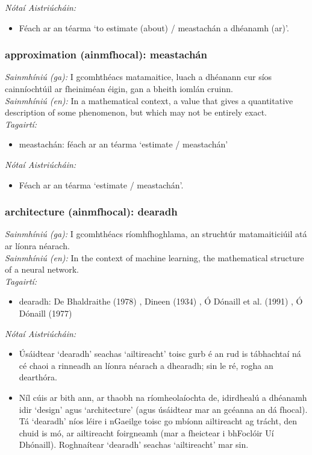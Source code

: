  \noindent \textit{Nótaí Aistriúcháin:}
\begin{itemize}
	\item Féach ar an téarma `to estimate (about) / meastachán a dhéanamh (ar)'.
\end{itemize}


\subsubsection*{approximation (ainmfhocal): meastachán}
 \noindent \textit{Sainmhíniú (ga):} I gcomhthéacs matamaitice, luach a dhéanann cur síos cainníochtúil ar fheiniméan éigin, gan a bheith iomlán cruinn.
\\
 \noindent \textit{Sainmhíniú (en):} In a mathematical context, a value that gives a quantitative description of some phenomenon, but which may not be entirely exact.
\\
 \noindent \textit{Tagairtí:}
\begin{itemize}
	\item meastachán: féach ar an téarma `estimate / meastachán'
\end{itemize}

 \noindent \textit{Nótaí Aistriúcháin:}
\begin{itemize}
	\item Féach ar an téarma `estimate / meastachán'.
\end{itemize}


\subsubsection*{architecture (ainmfhocal): dearadh}
 \noindent \textit{Sainmhíniú (ga):} I gcomhthéacs ríomhfhoghlama, an struchtúr matamaiticiúil atá ar líonra néarach.
\\
 \noindent \textit{Sainmhíniú (en):} In the context of machine learning, the mathematical structure of a neural network.
\\
 \noindent \textit{Tagairtí:}
\begin{itemize}
	\item dearadh: De Bhaldraithe (1978) \cite{de-bhaldraithe}, Dineen (1934) \cite{dineen}, Ó Dónaill et al. (1991) \cite{focloir-beag}, Ó Dónaill (1977) \cite{odonaill}
\end{itemize}

 \noindent \textit{Nótaí Aistriúcháin:}
\begin{itemize}
	\item Úsáidtear `dearadh' seachas `ailtireacht' toisc gurb é an rud is tábhachtaí ná cé chaoi a rinneadh an líonra néarach a dhearadh; sin le ré, rogha an dearthóra.
	\item Níl cúis ar bith ann, ar thaobh na ríomheolaíochta de, idirdhealú a dhéanamh idir `design' agus `architecture' (agus úsáidtear mar an gcéanna an dá fhocal). Tá `dearadh' níos léire i nGaeilge toisc go mbíonn ailtireacht ag trácht, den chuid is mó, ar ailtireacht foirgneamh (mar a fheictear i bhFoclóir Uí Dhónaill). Roghnaítear `dearadh' seachas `ailtireacht' mar sin.
\end{itemize}


